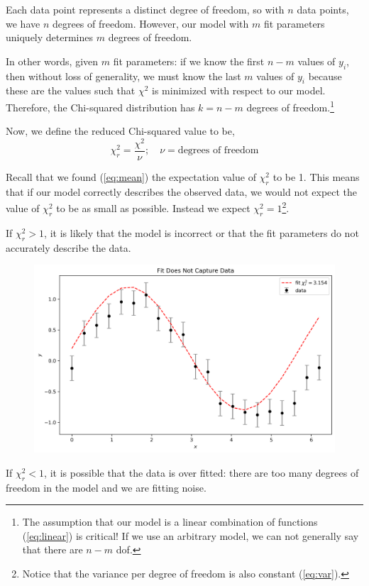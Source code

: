 \documentclass[12pt]{article}
\numberwithin{equation}{section}
\theoremstyle{definition}
\begin{document}
Each data point represents a distinct degree of freedom, so with $ n $ data points, we have $ n $ degrees of freedom. However, our model with $ m $ fit parameters uniquely determines $ m $ degrees of freedom. 

In other words, given $ m $ fit parameters: if we know the first $ n-m $ values of $ y_i $, then without loss of generality, we must know the last $ m $ values of $ y_i $ because these are the values such that $ \chi^2 $ is minimized with respect to our model. Therefore, the Chi-squared distribution has $ k=n-m $ degrees of freedom.\footnote{The assumption that our model is a linear combination of functions (\ref{eq:linear}) is critical! If we use an arbitrary model, we can not generally say that there are $n-m $ dof.} 

Now, we define the reduced Chi-squared value to be,
\begin{equation}
		\chi^2_r =\frac{\chi^2}{\nu}; \quad\nu = \text{degrees of freedom}
\end{equation}

Recall that we found (\ref{eq:mean}) the expectation value of $ \chi^2_r $ to be 1. This means that if our model correctly describes the observed data, we would not expect the value of $ \chi^2_r $ to be as small as possible. Instead we expect $ \chi^2_r  =1 $\footnote{Notice that the variance per degree of freedom is also constant (\ref{eq:var}).}. 

If $ \chi^2_r>1 $, it is likely that the model is incorrect or that the fit parameters do not accurately describe the data.

\begin{figure}[H]
	\centering
	\includegraphics[width=12cm] {bad}
\end{figure}

If $\chi^2_r<1$, it is possible that the data is over fitted: there are too many degrees of freedom in the model and we are fitting noise.
\end{document}

